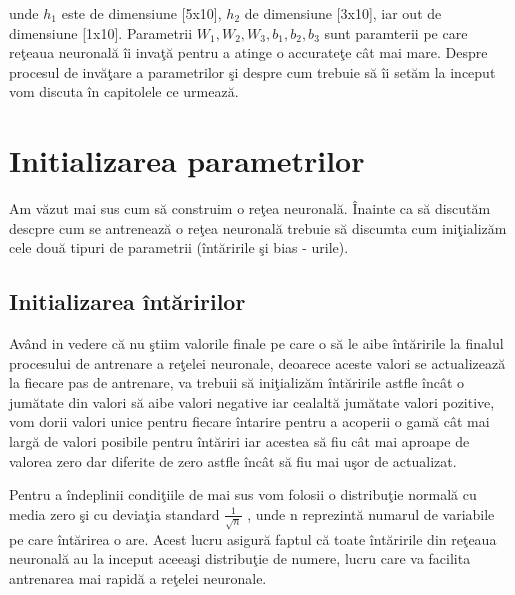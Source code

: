 unde $h_1$ este de dimensiune [5x10], $h_2$ de dimensiune [3x10], iar out de dimensiune [1x10]. Parametrii $W_1, W_2, W_3, b_1, b_2, b_3$ sunt paramterii pe care re\c{t}eaua neuronal\u{a} \^{i}i inva\c{t}\u{a} pentru a atinge o accurate\c{t}e c\^{a}t mai mare. Despre procesul de inv\u{a}\c{t}are a parametrilor \c{s}i despre cum trebuie s\u{a} \^{i}i set\u{a}m la inceput vom discuta \^{i}n capitolele ce urmeaz\u{a}.

\section{Initializarea parametrilor}

Am v\u{a}zut mai sus cum s\u{a} construim o re\c{t}ea neuronal\u{a}. \^{I}nainte ca s\u{a} discut\u{a}m descpre cum se antreneaz\u{a} o re\c{t}ea neuronal\u{a} trebuie s\u{a} discumta cum ini\c{t}ializ\u{a}m cele dou\u{a} tipuri de parametrii (\^{i}nt\u{a}ririle \c{s}i bias - urile). 

\subsection{Initializarea \^{i}nt\u{a}ririlor}

Av\^{a}nd in vedere c\u{a} nu \c{s}tiim valorile finale pe care o s\u{a} le aibe \^{i}nt\u{a}ririle la finalul procesului de antrenare a re\c{t}elei neuronale, deoarece aceste valori se actualizeaz\u{a} la fiecare pas de antrenare, va trebuii s\u{a} ini\c{t}ializ\u{a}m \^{i}nt\u{a}ririle astfle \^{i}nc\^{a}t o jum\u{a}tate din valori s\u{a} aibe valori negative iar cealalt\u{a} jum\u{a}tate valori pozitive, vom dorii valori unice pentru fiecare \^{i}ntarire pentru a acoperii o gam\u{a} c\^{a}t mai larg\u{a} de valori posibile pentru \^{i}nt\u{a}riri iar acestea s\u{a} fiu c\^{a}t mai aproape de valorea zero dar diferite de zero astfle \^{i}nc\^{a}t s\u{a} fiu mai u\c{s}or de actualizat.

\par

Pentru a \^{i}ndeplinii condi\c{t}iile de mai sus vom folosii o distribu\c{t}ie normal\u{a} cu media zero \c{s}i cu devia\c{t}ia standard $\frac{1}{\sqrt{n}}$ , unde n reprezint\u{a} numarul de variabile pe care \^{i}nt\u{a}rirea o are. Acest lucru asigur\u{a} faptul c\u{a} toate \^{i}nt\u{a}ririle din re\c{t}eaua neuronal\u{a} au la inceput aceea\c{s}i distribu\c{t}ie de numere, lucru care va facilita antrenarea mai rapid\u{a} a re\c{t}elei neuronale.

\par 

